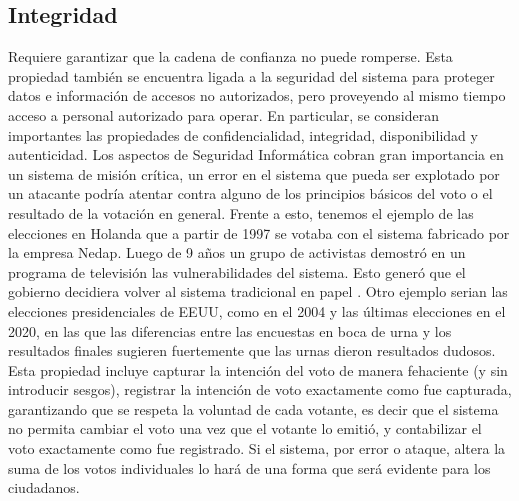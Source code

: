\subsection{Integridad}
Requiere garantizar que la cadena de confianza no puede romperse. Esta propiedad también se encuentra ligada a la seguridad del sistema para proteger datos e información de accesos no autorizados, pero proveyendo al mismo tiempo acceso a personal autorizado para operar. En particular, se consideran importantes las propiedades de confidencialidad, integridad, disponibilidad y autenticidad. Los aspectos de Seguridad Informática cobran gran importancia en un sistema de misión crítica, un error en el sistema que pueda ser explotado por un atacante podría atentar contra alguno de los principios básicos del voto o el resultado de la votación en general. Frente a esto, tenemos el ejemplo de las elecciones en Holanda que a partir de 1997 se votaba con el sistema fabricado por la empresa Nedap. Luego de 9 años un grupo de activistas demostró en un programa de televisión las vulnerabilidades del sistema. Esto generó que el gobierno decidiera volver al sistema tradicional en papel \cite{eleccionesHolanda}. 
Otro ejemplo serian las elecciones presidenciales de EEUU, como en el 2004 y las últimas elecciones en el 2020, en las que las diferencias entre las encuestas en boca de urna y los resultados finales sugieren fuertemente que las urnas dieron resultados dudosos.\newline
Esta propiedad incluye capturar la intención del voto de manera fehaciente (y sin introducir sesgos), registrar la intención de voto exactamente como fue capturada, garantizando que se respeta la voluntad de cada votante, es decir que el sistema no permita cambiar el voto una vez que el votante lo emitió, y contabilizar el voto exactamente como fue registrado. Si el sistema, por error o ataque, altera la suma de los votos individuales lo hará de una forma que será evidente para los ciudadanos.

